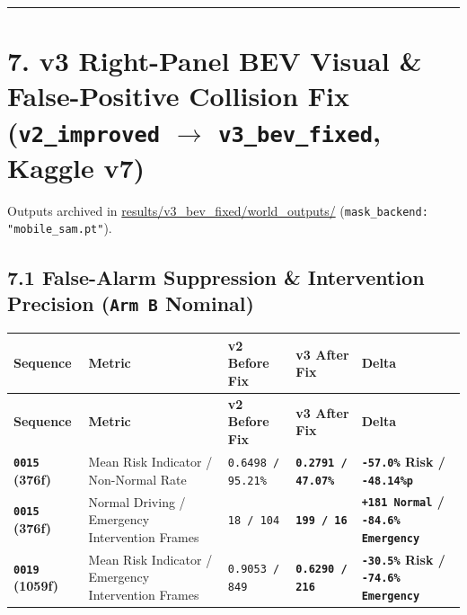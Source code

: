 \documentclass[10.5pt,a4paper]{article}
\begin{document}
\par\noindent\rule{\textwidth}{0.4pt}\par\medskip

\section{7. v3 Right-Panel BEV Visual \& False-Positive Collision Fix (\texttt{v2\_\allowbreak{}improved} $\rightarrow$ \texttt{v3\_\allowbreak{}bev\_\allowbreak{}fixed}, Kaggle v7)}

Outputs archived in \href{https://github.com/Heisnotanimposter/Totalcare\_autonomous\_driving\_Yolov5/tree/main/results/v3\_bev\_fixed/world\_outputs}{results/v3\_bev\_fixed/world\_outputs/} (\texttt{mask\_\allowbreak{}backend:\allowbreak{} "mobile\_\allowbreak{}sam.\allowbreak{}pt"}).


\subsection{7.1 False-Alarm Suppression \& Intervention Precision (\texttt{Arm B} Nominal)}

\begin{footnotesize}
\setlength{\tabcolsep}{4pt}
\setlength{\LTleft}{0pt}\setlength{\LTright}{0pt}
\begin{longtable}{>{\raggedright\arraybackslash}p{} >{\raggedright\arraybackslash}p{} >{\raggedright\arraybackslash}p{} >{\raggedright\arraybackslash}p{} >{\raggedright\arraybackslash}p{}}
\toprule
\textbf{Sequence} & \textbf{Metric} & \textbf{v2 Before Fix} & \textbf{v3 After Fix} & \textbf{Delta} \\
\midrule
\endfirsthead
\toprule
\textbf{Sequence} & \textbf{Metric} & \textbf{v2 Before Fix} & \textbf{v3 After Fix} & \textbf{Delta} \\
\midrule
\endhead
\bottomrule
\endfoot
\textbf{\texttt{0015} (376f)} & Mean Risk Indicator / Non-Normal Rate & \texttt{0.\allowbreak{}6498 /\allowbreak{} 95.\allowbreak{}21\%} & \textbf{\texttt{0.\allowbreak{}2791 /\allowbreak{} 47.\allowbreak{}07\%}} & \textbf{\texttt{-\allowbreak{}57.\allowbreak{}0\%} Risk / \texttt{-\allowbreak{}48.\allowbreak{}14\%p}} \\
\textbf{\texttt{0015} (376f)} & Normal Driving / Emergency Intervention Frames & \texttt{18 /\allowbreak{} 104} & \textbf{\texttt{199 /\allowbreak{} 16}} & \textbf{\texttt{+181 Normal} / \texttt{-\allowbreak{}84.\allowbreak{}6\% Emergency}} \\
\textbf{\texttt{0019} (1059f)} & Mean Risk Indicator / Emergency Intervention Frames & \texttt{0.\allowbreak{}9053 /\allowbreak{} 849} & \textbf{\texttt{0.\allowbreak{}6290 /\allowbreak{} 216}} & \textbf{\texttt{-\allowbreak{}30.\allowbreak{}5\%} Risk / \texttt{-\allowbreak{}74.\allowbreak{}6\% Emergency}} \\
\end{longtable}
\end{footnotesize}
\end{document}
